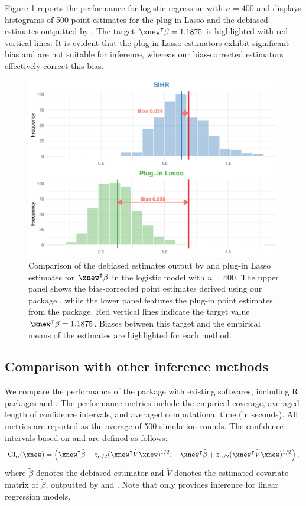 Figure \ref{fig: bias plot} reports the performance for logistic regression with $n=400$ and displays histograms of 500 point estimates for the plug-in Lasso and the debiased estimates outputted by .  The target $\xnew^\intercal \beta = 1.1875$ is highlighted with red vertical lines. It is evident that the plug-in Lasso estimators exhibit significant bias and are not suitable for inference, whereas our bias-corrected estimators effectively correct this bias.
\begin{figure}[ht]
    \centering
    \includegraphics[width=0.7\linewidth]{SIHR-Bias.pdf}
    \caption{Comparison of the debiased estimates output by  and plug-in Lasso estimates for $\xnew^\intercal \beta$ in the logistic model with $n=400$. The upper panel shows the bias-corrected point estimates derived using our package , while the lower panel features the plug-in point estimates from the  package. Red vertical lines indicate the target value $\xnew^\intercal \beta = 1.1875$. Biases between this target and the empirical means of the estimates are highlighted for each method.} %
    \label{fig: bias plot}
\end{figure}

\subsection{Comparison with other inference methods}
We compare the performance of the  package with existing softwares, including R packages  and . The performance metrics include the empirical coverage, averaged length of confidence intervals, and averaged computational time (in seconds). All metrics are reported as the average of 500 simulation rounds. The confidence intervals based on  and  are defined as follows:
\[
{\rm CI}_\alpha(\xnew) = \left(\xnew^\intercal \widetilde{\beta} - z_{\alpha/2} (\xnew^\intercal\widetilde{V}\xnew)^{1/2}, \quad
\xnew^\intercal\widetilde{\beta} + z_{\alpha/2} (\xnew^\intercal\widetilde{V}\xnew)^{1/2}
\right),
\]
where $\widetilde{\beta}$ denotes the debiased estimator and $\widetilde{V}$ denotes the estimated covariate matrix of $\widetilde{\beta}$, outputted by  and .
Note that  only provides inference for linear regression models.
\vspace{-5mm}
